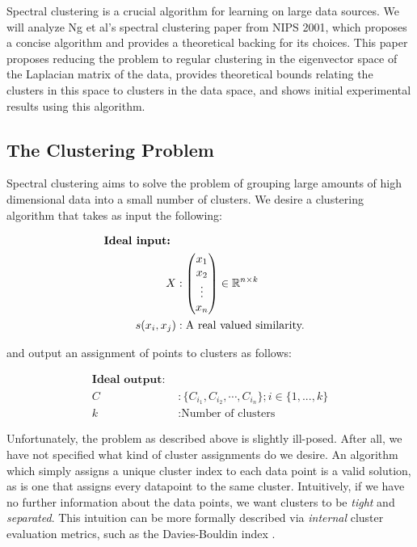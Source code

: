 Spectral clustering is a crucial algorithm for learning on large data sources.
We will analyze Ng et al's \cite{ng2002spectral} spectral clustering paper from
NIPS 2001, which proposes a concise algorithm and provides a theoretical
backing for its choices. This paper proposes reducing the problem to regular
clustering in the eigenvector space of the Laplacian matrix of the data,
provides theoretical bounds relating the clusters in this space to clusters in
the data space, and shows initial experimental results using this algorithm.

\subsection{The Clustering Problem}
Spectral clustering aims to solve the problem of grouping large amounts of high
dimensional data into a small number of clusters. We desire a clustering
algorithm that takes as input the following:

\begin{align*}
\textbf{Ideal input: } \label{clustering:idealinput} \\
X &: \begin{pmatrix}
        x_1 \\
        x_2 \\
        \vdots \\
        x_n
     \end{pmatrix} \in \mathbb{R}^{n \times k} \\
s(x_i, x_j) &: \text{A real valued similarity.}
\end{align*}

and output an assignment of points to clusters as follows:

\begin{align*}
    \textbf{Ideal output: } \\
C &: \{ C_{i_1}, C_{i_2}, \cdots, C_{i_n} \} ; i \in \{1,...,k\} \\
k &: \text{Number of clusters}
\end{align*}

Unfortunately, the problem as described above is slightly ill-posed.
After all, we have not specified what kind of cluster assignments do we desire.
An algorithm which simply assigns a unique cluster index to each data point is
a valid solution, as is one that assigns every datapoint to the same cluster.
Intuitively, if we have no further information about the data points, we want
clusters to be \textit{tight} and \textit{separated}. This intuition can be more
formally described via \textit{internal} cluster evaluation metrics, such as the 
Davies-Bouldin index \cite{davies1979cluster}.

